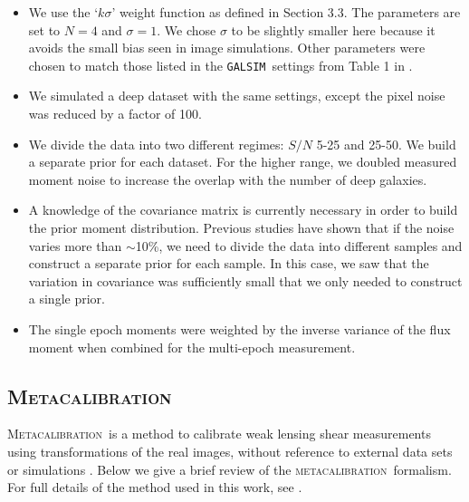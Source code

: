 \documentclass[fleqn,useAMS,usenatbib]{mnras}
\newcommand{\galsim}{\texttt{GALSIM}}
\newcommand{\mcal}{\textsc{metacalibration}}
\newcommand{\Mcal}{\textsc{Metacalibration}}
\begin{document}
\begin{itemize}
\item We use the `$k\sigma$' weight function as defined in \cite{Bernstein2016} 
Section 3.3.  The parameters are set to $N=4$ and $\sigma=1$.  We chose 
$\sigma$ to be slightly smaller here because it avoids the small bias seen in 
image simulations.  Other parameters were chosen to match those listed in the 
\galsim\ settings from Table 1 in \cite{Bernstein2016}.
\item We simulated a deep dataset with the same settings, except the pixel 
noise was reduced by a factor of 100.
\item We divide the data into two different regimes: $S/N$ 5-25 and 25-50.  We 
build a separate prior for each dataset.  For the higher range, we doubled 
measured moment noise to increase the overlap with the number of deep galaxies.
\item A knowledge of the covariance matrix is currently necessary in order to 
build the prior moment distribution.  Previous studies have shown that if the 
noise varies more than $\sim$10\%, we need to divide the data into different 
samples and construct a separate prior for each sample.  In this case, we saw 
that the variation in covariance was sufficiently small that we only needed to 
construct a single prior.
\item The single epoch moments were weighted by the inverse variance of the 
flux moment when combined for the multi-epoch measurement.  
\end{itemize}

\subsection{\Mcal}
\label{Section:Metacal}

\Mcal\ is a method to calibrate weak lensing shear measurements using
transformations of the real images, without reference to external data sets or
simulations \citep{HuffMand2017,SheldonHuff2017}.  Below we give a brief review
of the \mcal\ formalism.  For full details of the method used in this work, see
\cite{SheldonHuff2017}.
\end{document}
